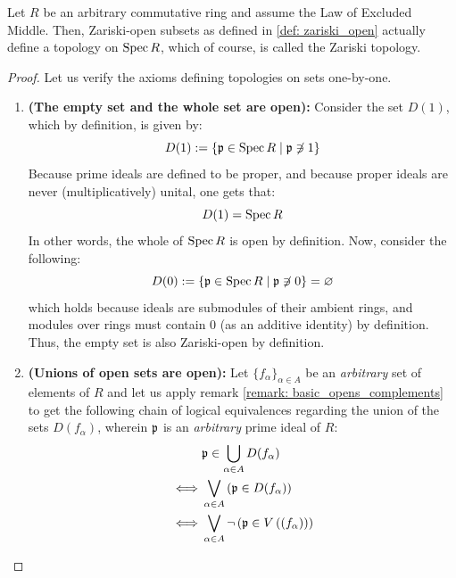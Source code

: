             \begin{proposition} \label{prop: zariski_open_well_definiteness}
                Let $R$ be an arbitrary commutative ring and assume the Law of Excluded Middle. Then, Zariski-open subsets as defined in \ref{def: zariski_open} actually define a topology on $\Spec R$, which of course, is called the Zariski topology.
            \end{proposition}
                \begin{proof}
                    Let us verify the axioms defining topologies on sets one-by-one.
                        \begin{enumerate}
                            \item \textbf{(The empty set and the whole set are open):} Consider the set $D(1)$, which by definition, is given by:
                                $$D(1) := \{\p \in \Spec R \mid \p \not \ni 1\}$$
                            Because prime ideals are defined to be proper, and because proper ideals are never (multiplicatively) unital, one gets that:
                                $$D(1) = \Spec R$$
                            In other words, the whole of $\Spec R$ is open by definition. Now, consider the following:
                                $$D(0) := \{\p \in \Spec R \mid \p \not \ni 0\} = \varnothing$$
                            which holds because ideals are submodules of their ambient rings, and modules over rings must contain $0$ (as an additive identity) by definition. Thus, the empty set is also Zariski-open by definition. 
                            \item \textbf{(Unions of open sets are open):} Let $\{f_{\alpha}\}_{\alpha \in A}$ be an \textit{arbitrary} set of elements of $R$ and let us apply remark \ref{remark: basic_opens_complements} to get the following chain of logical equivalences regarding the union of the sets $D(f_{\alpha})$, wherein $\p$ is an \textit{arbitrary} prime ideal of $R$:
                                $$
                                    \begin{aligned}
                                        & \p \in \bigcup_{\alpha \in A} D(f_{\alpha})
                                        \\
                                        \iff & \bigvee_{\alpha \in A} \left(\p \in D(f_{\alpha})\right)
                                        \\
                                        \iff & \bigvee_{\alpha \in A} \neg \left(\p \in V\left((f_{\alpha})\right)\right)

\end{aligned}$$
\end{enumerate}
\end{proof}
